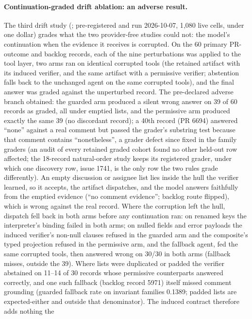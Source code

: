 \paragraph{Continuation-graded drift ablation: an adverse result.}
The third drift study
(; pre-registered
and run 2026-10-07, 1{,}080 live cells, under one dollar) grades what the two
provider-free studies could not: the model's continuation when the evidence it
receives is corrupted. On the 60 primary PR-outcome and backlog records, each
of the nine perturbations was applied to the tool layer, two arms ran on
identical corrupted tools (the retained artifact with its induced verifier,
and the same artifact with a permissive verifier; abstention falls back to the
unchanged agent on the same corrupted tools), and the final answer was graded
against the unperturbed record. The pre-declared adverse branch obtained: the
guarded arm produced a silent wrong answer on 39 of 60 records as graded,
all under emptied lists, and the permissive arm produced exactly the same 39
(no discordant record); a 40th record (PR 6694) answered ``none'' against a
real comment but passed the grader's substring test because that comment
contains ``nonetheless'', a grader defect since fixed in the family graders (an audit of every
retained graded cohort found no other held-out row affected; the 18-record
natural-order study keeps its registered grader, under which one discovery
row, issue 1741, is the only row the two rules grade differently). An empty discussion or assignee list lies inside the hull
the verifier learned, so it accepts, the artifact dispatches, and the model
answers faithfully from the emptied evidence (``no comment evidence'';
backlog route flipped), which is wrong against the real record. Where the
corruption left the hull, dispatch fell back in both arms before any
continuation ran: on renamed keys the interpreter's binding failed in both
arms; on nulled fields and error payloads the induced verifier's non-null
clauses refused in the guarded arm and the composite's typed projection
refused in the permissive arm, and the fallback agent, fed the same corrupted
tools, then answered wrong on 30/30 in both arms (fallback misses, outside the
39). Where lists were duplicated or padded the verifier abstained on 11--14 of
30 records whose permissive counterparts answered correctly, and one such
fallback (backlog record 5971) itself missed comment grounding (guarded
fallback rate on invariant families 0.1389; padded lists are expected-either
and outside that denominator). The induced contract therefore adds nothing the
